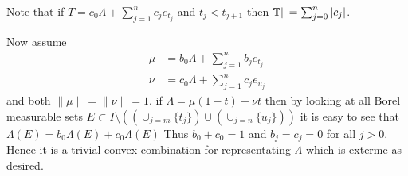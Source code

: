 \begin{enumerate}
\begin{itemize}
Note that if \(T = c_0\Lambda + \sum_{j=1}^n c_je_{t_j}\)
and \(t_j < t_{j+1}\) then \(\mathbb{T}\| = \sum_{j=0}^n |c_j|\).

Now assume
\begin{align*}
\mu &= b_0\Lambda + \sum_{j=1}^n b_j e_{t_j} \\
\nu &= c_0\Lambda + \sum_{j=1}^n c_j e_{u_j} 
\end{align*}
and both
 \(\|\mu\| = \|\nu\| = 1\).
if \(\Lambda = \mu (1-t) + \nu t\)
then by looking at all Borel measurable sets
 \(E \subset I \setminus 
     \left(
     \left(\cup_{j=m} \{t_j\}\right)
     \cup
     \left(\cup_{j=n} \{u_j\}\right)
     \right)\)
it is easy to see that \(\Lambda(E) =  b_0\Lambda(E) + c_0 \Lambda(E)\)
Thus \(b_0 + c_0 = 1\) and \(b_j = c_j = 0\) for all \(j>0\).
Hence it is a trivial convex combination for representating \(\Lambda\)
which is exterme as desired.
\end{itemize}




\end{enumerate}
